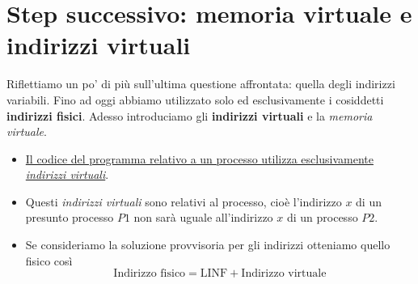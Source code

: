 \section{Step successivo: memoria virtuale e indirizzi virtuali}
Riflettiamo un po' di più sull'ultima questione affrontata: quella degli indirizzi variabili. Fino ad oggi abbiamo utilizzato solo ed esclusivamente i cosiddetti \textbf{indirizzi fisici}. Adesso introduciamo gli \textbf{indirizzi virtuali} e la \emph{memoria virtuale}.
\begin{itemize}
	\item \underline{Il codice del programma relativo a un processo utilizza esclusivamente \emph{indirizzi virtuali}}.
	\item Questi \emph{indirizzi virtuali} sono relativi al processo, cioè l'indirizzo $x$ di un presunto processo $P1$ non sarà uguale all'indirizzo $x$ di un processo $P2$.
	\item Se consideriamo la soluzione provvisoria per gli indirizzi otteniamo quello fisico così
	\[\text{Indirizzo fisico}=\text{LINF}+\text{Indirizzo virtuale}\]
\end{itemize}

